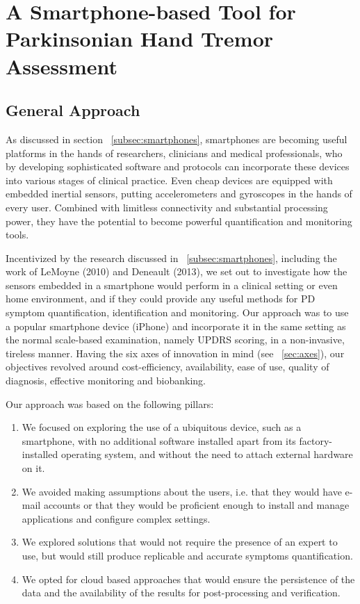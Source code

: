 \chapter{A Smartphone-based Tool for Parkinsonian Hand Tremor Assessment}
\label{ch:smartphone}
\pagestyle{fancy}
\fancyhf{}
\fancyhead[OC]{\leftmark}
\fancyhead[EC]{\rightmark}
\cfoot{\thepage}


\section{General Approach}
\label{sec:smartGenApproach}
As discussed in section ~\ref{subsec:smartphones}, smartphones are becoming useful platforms in the hands of researchers, clinicians and medical professionals, who by developing sophisticated software and protocols can incorporate these devices into various stages of clinical practice. Even cheap devices are equipped with embedded inertial sensors, putting accelerometers and gyroscopes in the hands of every user. Combined with limitless connectivity and substantial processing power, they have the potential to become powerful quantification and monitoring tools.

Incentivized by the research discussed in ~\ref{subsec:smartphones}, including the work of LeMoyne (2010) and Deneault (2013), we set out to investigate how the sensors embedded in a smartphone would perform in a clinical setting or even home environment, and if they could provide any useful methods for \gls{PD} symptom quantification, identification and monitoring. Our approach was to use a popular smartphone device (iPhone) and incorporate it in the same setting as the normal scale-based examination, namely \gls{UPDRS} scoring, in a non-invasive, tireless manner. Having the six axes of innovation in mind (see ~\ref{sec:axes}), our objectives revolved around cost-efficiency, availability, ease of use, quality of diagnosis, effective monitoring and biobanking. 

Our approach was based on the following pillars: 

\begin{enumerate}
\item We focused on exploring the use of a ubiquitous device, such as a smartphone, with no additional software installed apart from its factory-installed operating system, and without the need to attach external hardware on it. 
\item We avoided making assumptions about the users, i.e. that they would have e-mail accounts or that they would be proficient enough to install and manage applications and configure complex settings. 
\item We explored solutions that would not require the presence of an expert to use, but would still produce replicable and accurate symptoms quantification. 
\item We opted for cloud based approaches that would ensure the persistence of the data and the availability of the results for post-processing and verification. 
\end{enumerate}

